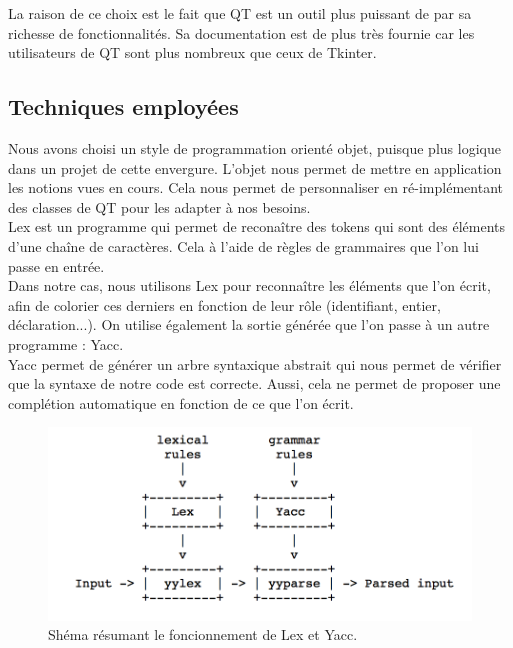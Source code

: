 \documentclass[a4paper,12pt]{article}
\begin{document}
	La raison de ce choix est le fait que QT est un outil plus puissant de par sa richesse de fonctionnalités. Sa documentation est de plus très fournie car les utilisateurs de QT sont plus nombreux que ceux de Tkinter.
	
	\subsection{Techniques employées}
	
	Nous avons choisi un style de programmation orienté objet, puisque plus logique dans un projet de cette envergure. L'objet nous permet de mettre en application les notions vues en cours. Cela nous permet de personnaliser en ré-implémentant des classes de QT pour les adapter à nos besoins.\\
	
	Lex est un programme qui permet de reconaître des tokens qui sont des éléments d'une chaîne de caractères. Cela à l'aide de règles de grammaires que l'on lui passe en entrée.\\
	Dans notre cas, nous utilisons Lex pour reconnaître les éléments que l'on écrit, afin de colorier ces derniers en fonction de leur rôle (identifiant, entier, déclaration...). On utilise également la sortie générée que l'on passe à un autre programme : Yacc.\\
	
	Yacc permet de générer un arbre syntaxique abstrait qui nous permet de vérifier que la syntaxe de notre code est correcte. Aussi, cela ne permet de proposer une complétion automatique en fonction de ce que l'on écrit.\\
	
	\begin{figure}[h!]
		\begin{center}
			\includegraphics[scale=0.7]{images/schema_lex_yacc}
			\caption{Shéma résumant le foncionnement de Lex et Yacc.}
		\end{center}
	\end{figure}
	
\end{document}
